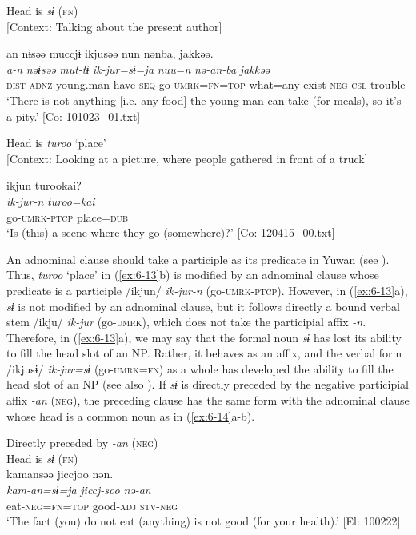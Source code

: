 \ea\label{ex:6-13}
\ea Head is \textit{sɨ} (\textsc{fn})\\{}
[Context: Talking about the present author]

{\TM}
\glll an  nɨsəə  muccjɨ  ikjusəə  nun  nənba,  jakkəə.\\
\textit{a-n}  \textit{nəɨsəə}  \textit{mut-tɨ}  \textit{ik-jur=sɨ=ja}  \textit{nuu=n}   \textit{nə-an-ba}  \textit{jakkəə}\\
    \textsc{dist}-\textsc{adnz}  young.man  have-\textsc{seq}  go-\textsc{umrk}=\textsc{fn}=\textsc{top}  what=any    exist-\textsc{neg}-\textsc{csl}  trouble\\
\glt    ‘There is not anything [i.e. any food] the young man can take (for meals), so it’s a pity.’ [Co: 101023\_01.txt]
\z

\ex Head is \textit{turoo} ‘place’\\{}
  [Context: Looking at a picture, where people gathered in front of a truck]

{\TM}
\glll ikjun  turookai?\\
\textit{ik-jur-n}  \textit{turoo=kai}\\
    go-\textsc{umrk}-\textsc{ptcp}  place=\textsc{dub}\\
\glt    ‘Is (this) a scene where they go (somewhere)?’ [Co: 120415\_00.txt]
\z

An adnominal clause should take a participle as its predicate in Yuwan (see ). Thus, \textit{turoo} ‘place’ in (\ref{ex:6-13}b) is modified by an adnominal clause whose predicate is a participle /ikjun/ \textit{ik-jur-n} (go-\textsc{umrk}-\textsc{ptcp}). However, in (\ref{ex:6-13}a), \textit{sɨ} is not modified by an adnominal clause, but it follows directly a bound verbal stem /ikju/ \textit{ik-jur} (go-\textsc{umrk}), which does not take the participial affix \textit{-n}. Therefore, in (\ref{ex:6-13}a), we may say that the formal noun \textit{sɨ} has lost its ability to fill the head slot of an NP. Rather, it behaves as an affix, and the verbal form /ikjusɨ/ \textit{ik-jur=sɨ} (go-\textsc{umrk}=\textsc{fn}) as a whole has developed the ability to fill the head slot of an NP (see also ). If \textit{sɨ} is directly preceded by the negative participial affix \textit{-an} (\textsc{neg}), the preceding clause has the same form with the adnominal clause whose head is a common noun as in (\ref{ex:6-14}a-b).

\ea\label{ex:6-14}
 Directly preceded by \textit{-an} (\textsc{neg})\\
 \ea Head is \textit{sɨ} (\textsc{fn})\\
{\TM}
\glll  kamansəə  jiccjoo  nən.\\
\textit{kam-an=sɨ=ja}  \textit{jiccj-soo}  \textit{nə-an}\\
eat-\textsc{neg}=\textsc{fn}=\textsc{top}  good-\textsc{adj}  \textsc{stv}-\textsc{neg}\\
\glt ‘The fact (you) do not eat (anything) is not good (for your health).’ [El: 100222]

